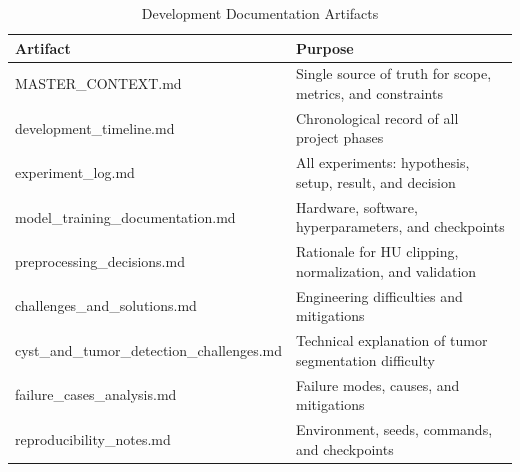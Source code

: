 
\begin{table}[!t]
\caption{Development Documentation Artifacts}
\label{tab:dev_artifacts}
\centering
\begin{tabular}{@{}lp{6cm}@{}}
\toprule
\textbf{Artifact} & \textbf{Purpose} \\
\midrule
MASTER\_CONTEXT.md & Single source of truth for scope, metrics, and constraints \\
development\_timeline.md & Chronological record of all project phases \\
experiment\_log.md & All experiments: hypothesis, setup, result, and decision \\
model\_training\_documentation.md & Hardware, software, hyperparameters, and checkpoints \\
preprocessing\_decisions.md & Rationale for HU clipping, normalization, and validation \\
challenges\_and\_solutions.md & Engineering difficulties and mitigations \\
cyst\_and\_tumor\_detection\_challenges.md & Technical explanation of tumor segmentation difficulty \\
failure\_cases\_analysis.md & Failure modes, causes, and mitigations \\
reproducibility\_notes.md & Environment, seeds, commands, and checkpoints \\
\bottomrule
\end{tabular}
\end{table}

